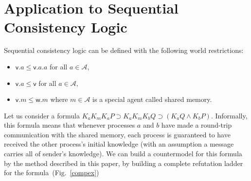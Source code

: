 \documentclass[doctor]{iscs-thesis}
\newcommand{\agents}{\mathcal A}
\begin{document}
\section{Application to Sequential Consistency Logic}

Sequential consistency logic can be defined with the following world
restrictions:
\begin{itemize}
 \item $\mathsf v.a\le\mathsf v.a.a$ for all $a\in\agents$,
 \item $\mathsf v.a\le\mathsf v$ for all $a\in\agents$,
 \item $\mathsf v.m\le\mathsf w.m$ where $m\in\agents$ is a special
       agent called shared memory.
\end{itemize}

Let us consider a formula $K_a K_m K_a P\supset K_a K_m K_b Q\supset
(K_a Q\wedge K_b P)$.
Informally, this formula means that whenever processes $a$ and $b$ have
made a round-trip communication with the shared memory, each process is
guaranteed to have received the other process's initial knowledge (with
an assumption a message carries all of sender's knowledge).
We can build a countermodel for this formula by the method described in
this paper, by building
a complete refutation ladder for the formula~(Fig.~\ref{compex})
\end{document}
